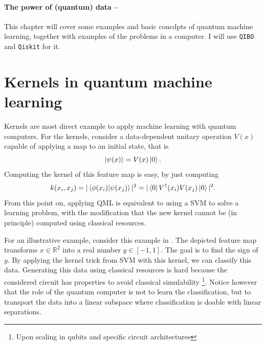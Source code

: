 \documentclass[]{report}
\begin{document}
\paragraph{The power of (quantum) data --}

This chapter will cover some examples and basic concdpts of quantum machine learning, together with examples of the problems in a computer. I will use {\tt QIBO} and {\tt Qiskit} for it.  

\section{Kernels in quantum machine learning}

Kernels are most direct example to apply machine learning with quantum computers. For the kernels, consider a data-dependent unitary operation $V(x)$ capable of applying a map to an initial state, that is
\begin{equation}
\ket{\psi(x)} = V(x) \ket 0.
\end{equation}
Computing the kernel of this feature map is easy, by just computing
\begin{equation}
k(x_i, x_j) = \vert \braket{\phi(x_i)}{\psi(x_j)} \vert^2 = \vert \bra 0 V^\dagger (x_i) V(x_j) \ket 0 \vert^2.
\end{equation}
From this point on, applying QML is equivalent to using a SVM to solve a learning problem, with the modification that the new kernel cannot be (in principle) computed using classical resources. 

For an illustrative example, consider this example in  \cite{havlicek2019supervised}. The depicted feature map transforms $x \in \mathbb R^2$ into a real number $y \in [-1, 1]$. The goal is to find the sign of $y$. By applying the kernel trick from SVM with this kernel, we can classify this data. 
Generating this data using classical resources is hard because the considered circuit has properties to avoid classical simulability \footnote{Upon scaling in qubits and specific circuit architectures}. Notice however that the role of the quantum computer is not to learn the classification, but to transport the data into a linear subspace where classification is doable with linear separations. 
\end{document}

